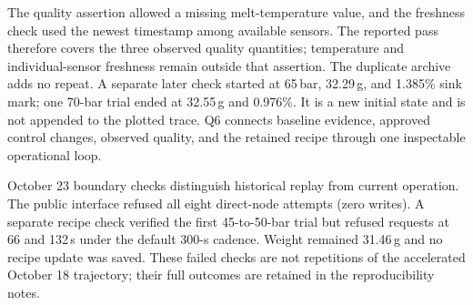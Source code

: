 The quality assertion allowed a missing melt-temperature value, and the
freshness check used the newest timestamp among available sensors. The
reported pass therefore covers the three observed quality quantities;
temperature and individual-sensor freshness remain outside that assertion.
The duplicate archive adds no repeat.
A separate later check started at 65\,bar,
32.29\,g, and 1.385\% sink mark; one 70-bar trial ended at 32.55\,g and
0.976\%. It is a new initial state and is not appended to the plotted trace.
Q6 connects baseline evidence, approved control changes, observed quality,
and the retained recipe through one inspectable operational loop.

October 23 boundary checks distinguish historical replay from current
operation. The public interface refused all eight direct-node attempts
(zero writes). A separate recipe check verified the first 45-to-50-bar trial
but refused requests at 66 and 132\,s under the default 300-s cadence.
Weight remained 31.46\,g and no recipe update was saved. These failed
checks are not repetitions of the accelerated October 18 trajectory;
their full outcomes are retained in the reproducibility notes.
